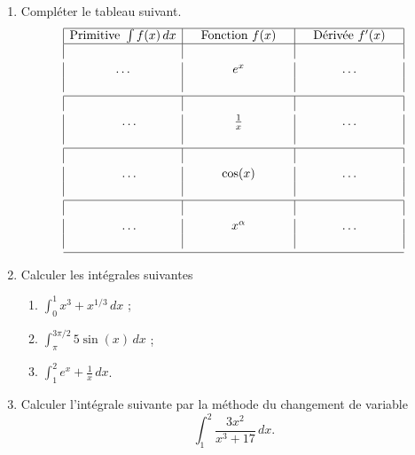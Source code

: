 
\begin{exercice}\label{exoanalyseCTU-0013}


\begin{enumerate}
\item 
Compléter le tableau suivant. 
  \begin{equation}
    \begin{array}{|c|c|c|}\hline 
      \text{Primitive } \int f(x)\, dx & \quad\text{Fonction } f(x)\quad &\quad \text{Dérivée } f'(x)\quad \\\hline 
      \vspace{1mm}&&\\
      \quad\ldots\quad & \quad e^x \quad&\quad \ldots \quad\\
      \vspace{1mm}&&\\\hline
      \vspace{1mm}&&\\
      \quad\ldots & \frac{1}{x} & \ldots\\
      \vspace{1mm}&&\\\hline 
      \vspace{1mm}&&\\
      \quad\ldots & \cos(x) & \ldots \\
      \vspace{1mm}&&\\\hline 
      \vspace{1mm}&&\\
      \quad\ldots & \quad x^\alpha\quad & \ldots \\
      \vspace{1mm}&&\\\hline 
    \end{array}
  \end{equation}
  \item Calculer les intégrales suivantes
    \begin{enumerate}
    \item $\displaystyle \int_0^1 x^3+x^{1/3} \, dx$ ;
    \item $\displaystyle \int_\pi^{3\pi/2} 5\sin(x) \, dx$ ;
    \item $\displaystyle \int_1^{2} e^x + \frac{1}{x} \, dx$. 
    \end{enumerate}
\item Calculer l'intégrale suivante par la méthode du changement de variable
 \[ \int_1^2 \frac{3x^2}{x^3 +17} \, dx.\]
\end{enumerate}


\end{exercice}

